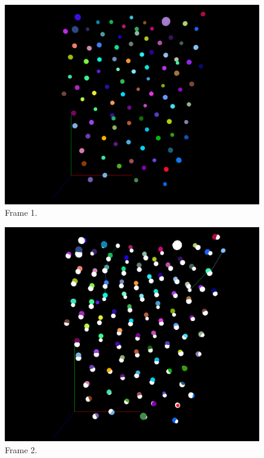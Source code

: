 \documentclass{article}
\begin{document}
\begin{figure}[!hbt]
	\centering
    \centerline{\includegraphics[width=40em]{images/f1.png}}
    \caption{Frame 1.}
    \label{fig:f1}
\end{figure}

\begin{figure}[!hbt]
	\centering
    \centerline{\includegraphics[width=40em]{images/f2.png}}
    \caption{Frame 2.}
    \label{fig:f2}
\end{figure}
\end{document}
